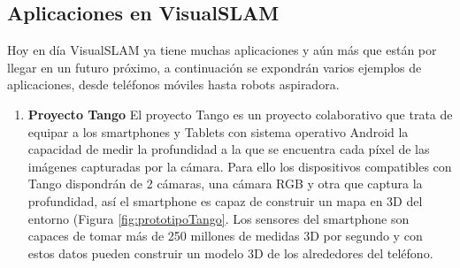 \subsection{Aplicaciones en VisualSLAM} 

Hoy en día VisualSLAM ya tiene muchas aplicaciones y aún más que están por llegar en un futuro próximo, a continuación se expondrán varios ejemplos de aplicaciones, desde teléfonos móviles hasta robots aspiradora.
\begin {enumerate}
\item \textbf{Proyecto Tango}
El proyecto Tango es un proyecto colaborativo que trata de equipar a los smartphones y Tablets con sistema operativo Android la capacidad de medir la profundidad a la que se encuentra cada píxel de las imágenes capturadas por la cámara. Para ello los dispositivos compatibles con Tango dispondrán de 2 cámaras, una cámara RGB y otra que captura la profundidad, así el smartphone es capaz de construir un mapa en 3D del entorno (Figura \ref{fig:prototipoTango}. Los sensores del smartphone son capaces de tomar más de 250 millones de medidas 3D por segundo y con estos datos pueden  construir un modelo 3D de los alrededores del teléfono.
\begin{figure}[htbp]
\begin{center}
\hspace{0.5cm}

\end{center}
\end{figure}
\end{enumerate}
